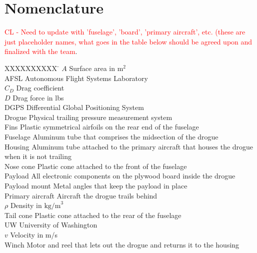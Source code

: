 \section*{Nomenclature}\label{sec:nomenclature}
\textcolor{red}{CL - Need to update with 'fuselage', 'board', 'primary aircraft', etc. (these are just placeholder names, what goes in the table below should be agreed upon and finalized with the team}.
\begin{tabbing}
  XXXXXXXXXX \= \kill%
  $A$		\> Surface area in $\textrm{m}^2$ \\
  AFSL 		\> Autonomous Flight Systems Laboratory \\
  $C_{D}$	\> Drag coefficient \\
  $D$		\> Drag force in lbs \\
  DGPS 		\> Differential Global Positioning System \\
  Drogue	\> Physical trailing pressure measurement system \\
  Fins		\> Plastic symmetrical airfoils on the rear end of the fuselage \\
  Fuselage		\> Aluminum tube that comprises the midsection of the drogue \\
  Housing		\> Aluminum tube attached to the primary aircraft that houses the drogue when it is not trailing \\
  Nose cone		\> Plastic cone attached to the front of the fuselage \\
  Payload		\> All electronic components on the plywood board inside the drogue \\
  Payload mount		\> Metal angles that keep the payload in place \\
  Primary aircraft		\> Aircraft the drogue trails behind \\
  $\rho$	\> Density in $\textrm{kg/m}^3$ \\
  Tail cone		\> Plastic cone attached to the rear of the fuselage \\
  UW 		\> University of Washington \\
  $v$	\> Velocity in m/s \\
  Winch		\> Motor and reel that lets out the drogue and returns it to the housing\\
 \end{tabbing}
